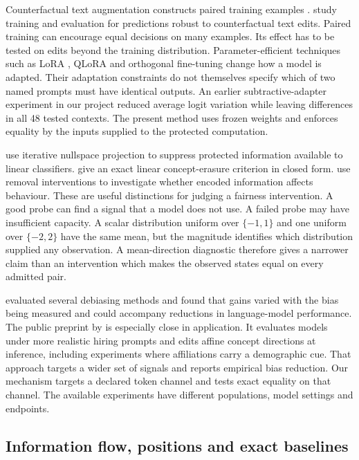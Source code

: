 Counterfactual text augmentation constructs paired training examples \citep{zmigrod2019}. \citet{garg2019} study training and evaluation for predictions robust to counterfactual text edits. Paired training can encourage equal decisions on many examples. Its effect has to be tested on edits beyond the training distribution. Parameter-efficient techniques such as LoRA \citep{hu2022}, QLoRA \citep{dettmers2023} and orthogonal fine-tuning \citep{qiu2023} change how a model is adapted. Their adaptation constraints do not themselves specify which of two named prompts must have identical outputs. An earlier subtractive-adapter experiment in our project reduced average logit variation while leaving differences in all 48 tested contexts. The present method uses frozen weights and enforces equality by the inputs supplied to the protected computation.

\citet{ravfogel2020} use iterative nullspace projection to suppress protected information available to linear classifiers. \citet{belrose2023} give an exact linear concept-erasure criterion in closed form. \citet{elazar2021} use removal interventions to investigate whether encoded information affects behaviour. These are useful distinctions for judging a fairness intervention. A good probe can find a signal that a model does not use. A failed probe may have insufficient capacity. A scalar distribution uniform over \(\{-1,1\}\) and one uniform over \(\{-2,2\}\) have the same mean, but the magnitude identifies which distribution supplied any observation. A mean-direction diagnostic therefore gives a narrower claim than an intervention which makes the observed states equal on every admitted pair.

\citet{meade2022} evaluated several debiasing methods and found that gains varied with the bias being measured and could accompany reductions in language-model performance. The public preprint by \citet{karvonen2025} is especially close in application. It evaluates models under more realistic hiring prompts and edits affine concept directions at inference, including experiments where affiliations carry a demographic cue. That approach targets a wider set of signals and reports empirical bias reduction. Our mechanism targets a declared token channel and tests exact equality on that channel. The available experiments have different populations, model settings and endpoints.

\subsection{Information flow, positions and exact baselines}

